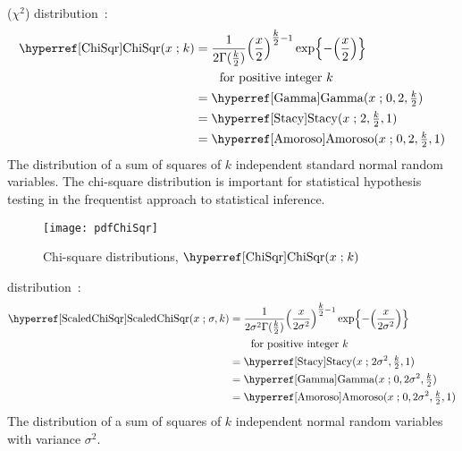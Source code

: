  ($\chi^2$)  distribution~\cite{Fisher1924,Johnson1994}:
\begin{align}
\label{ChiSqr}
\opr{ChiSqr}(x \given k) 
&= \frac{1}{2\Gamma(\tfrac{k}{2})} \Left(\frac{x}{2}\Right)^{\tfrac{k}{2}-1} 
\exp\Left\{-\Left(\frac{x}{2}\Right)\Right\} 	\checked
\\
& \qquad \text{for positive integer } k \notag \checked \\
&=  \opr{Gamma}(x\given  0, 2,\tfrac{k}{2}) \notag \checked \\
&=  \opr{Stacy}(x\given 2, \tfrac{k}{2},1) \notag \checked \\
&=  \opr{Amoroso}(x\given  0, 2, \tfrac{k}{2}, 1) \checked \notag 
\end{align}
The distribution of a sum of squares of $k$ independent standard normal random variables.  The chi-square distribution is important for statistical hypothesis testing in the frequentist approach to statistical inference.



\begin{figure}[t!]
\begin{center}
\texttt{[image: pdfChiSqr]}
\end{center}
\caption[Chi-square distributions]{Chi-square distributions, $\opr{ChiSqr}(x\given k)$}
\end{figure}



 distribution~\cite{Lee2012}:
\begin{align}
\label{ScaledChiSqr}
\opr{ScaledChiSqr}(x \given \sigma, k) 
&= \frac{1}{2\sigma^2\Gamma(\tfrac{k}{2})} \Left(\frac{x}{2\sigma^2}\Right)^{\tfrac{k}{2}-1} 
\exp\Left\{-\Left(\frac{x}{2\sigma^2} \Right)\Right\} \checked \\
& \qquad \text{for positive integer } k \notag \\
&=  \opr{Stacy}(x\given 2\sigma^2, \tfrac{k}{2},1)  \checked\notag \\
&=\opr{Gamma}(x\given 0, 2\sigma^2, \tfrac{k}{2}) \checked \notag \\
&=  \opr{Amoroso}(x\given  0, 2\sigma^2, \tfrac{k}{2}, 1) \checked \notag 
\end{align}
The distribution of a sum of squares of $k$ independent normal random variables with variance $\sigma^2$.

